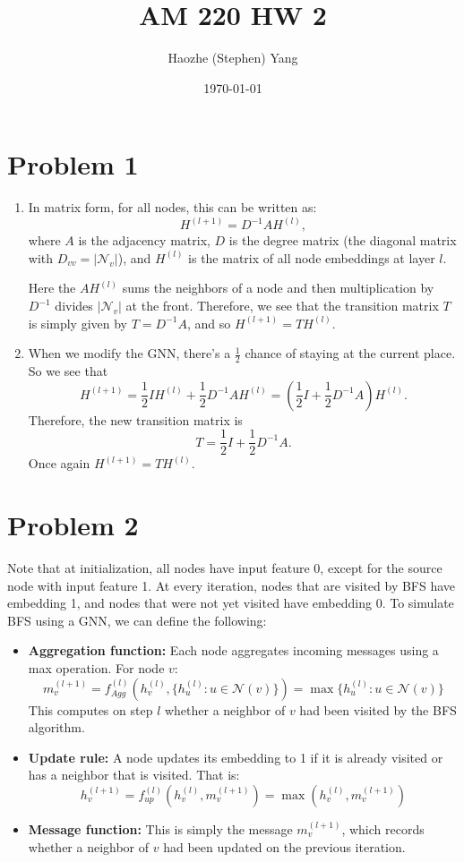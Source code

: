 \documentclass[11pt]{scrartcl}
\begin{document}
\title{AM 220 HW 2}
\author{Haozhe (Stephen) Yang}
\date{\today}
\maketitle

\section{Problem 1}

\begin{enumerate}
    \item In matrix form, for all nodes, this can be written as:
    \[
    H^{(l+1)} = D^{-1} A H^{(l)},
    \]
    where $A$ is the adjacency matrix, $D$ is the degree matrix (the diagonal matrix with $D_{vv} = |\mathcal N_v|$), and \( H^{(l)} \) is the matrix of all node embeddings at layer \( l \).

    Here the $A H^{(l)}$ sums the neighbors of a node and then multiplication by $D^{-1}$ divides $|\mathcal N_v|$ at the front. Therefore, we see that the transition matrix $T$ is simply given by $T = D^{-1}A$, and so $H^{(l+1)} = TH^{(l)}$.
    \item When we modify the GNN, there's a $\frac 12$ chance of staying at the current place. So we see that \[H^{(l+1)} = \frac{1}{2} I H^{(l)} + \frac{1}{2} D^{-1} A H^{(l)} = \left( \frac{1}{2} I + \frac{1}{2} D^{-1} A \right) H^{(l)}.\]
    Therefore, the new transition matrix is \[T = \frac{1}{2} I + \frac{1}{2} D^{-1} A.\]
    Once again $H^{(l+1)} = TH^{(l)}$.
\end{enumerate}

\newpage

\section{Problem 2}

Note that at initialization, all nodes have input feature 0, except for the source node with input feature 1. At every iteration, nodes that are visited by BFS have embedding 1, and nodes that were not yet visited have embedding 0. To simulate BFS using a GNN, we can define the following:

\begin{itemize}
    \item \textbf{Aggregation function:} Each node aggregates incoming messages using a max operation. For node \(v\): \[m_v^{(l+1)} = f_{Agg}^{(l)}(h_v^{(l)}, \{h_u^{(l)}: u \in \mathcal N(v)\}) = \max\{h_u^{(l)}: u \in \mathcal N(v)\}\]
    This computes on step $l$ whether a neighbor of $v$ had been visited by the BFS algorithm.
    \item \textbf{Update rule:} A node updates its embedding to 1 if it is already visited or has a neighbor that is visited. That is:
    \[
    h_v^{(l+1)} = f_{up}^{(l)}\left(h_v^{(l)}, m_v^{(l+1)}\right) = \max\left(h_v^{(l)}, m_v^{(l+1)}\right)
    \]
    \item \textbf{Message function:} This is simply the message $m_v^{(l+1)}$, which records whether a neighbor of $v$ had been updated on the previous iteration.
\end{itemize}
\end{document}
